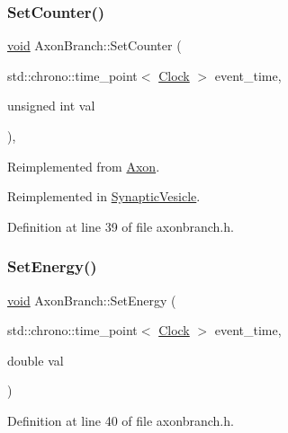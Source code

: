 \subsubsection{\texorpdfstring{Set\+Counter()}{SetCounter()}}
{\footnotesize\ttfamily \mbox{\hyperlink{glad_8h_a950fc91edb4504f62f1c577bf4727c29}{void}} Axon\+Branch\+::\+Set\+Counter (\begin{DoxyParamCaption}\item[{std\+::chrono\+::time\+\_\+point$<$ \mbox{\hyperlink{universe_8h_a0ef8d951d1ca5ab3cfaf7ab4c7a6fd80}{Clock}} $>$}]{event\+\_\+time,  }\item[{unsigned int}]{val }\end{DoxyParamCaption})\hspace{0.3cm}{\ttfamily [inline]}, {\ttfamily [virtual]}}



Reimplemented from \mbox{\hyperlink{class_axon_a3493cb97bde26bd66facc6084cd5f219}{Axon}}.



Reimplemented in \mbox{\hyperlink{class_synaptic_vesicle_a7fd7cfce5eccb904206d968866f85220}{Synaptic\+Vesicle}}.



Definition at line 39 of file axonbranch.\+h.

\mbox{\label{class_axon_branch_a6918dcaf6d9325a1a22a2e6c65ad5dab}} 
\subsubsection{\texorpdfstring{Set\+Energy()}{SetEnergy()}}
{\footnotesize\ttfamily \mbox{\hyperlink{glad_8h_a950fc91edb4504f62f1c577bf4727c29}{void}} Axon\+Branch\+::\+Set\+Energy (\begin{DoxyParamCaption}\item[{std\+::chrono\+::time\+\_\+point$<$ \mbox{\hyperlink{universe_8h_a0ef8d951d1ca5ab3cfaf7ab4c7a6fd80}{Clock}} $>$}]{event\+\_\+time,  }\item[{double}]{val }\end{DoxyParamCaption})\hspace{0.3cm}{\ttfamily [inline]}}



Definition at line 40 of file axonbranch.\+h.

\mbox{\label{class_axon_branch_a5a80bcccdc2be9f77fca25131937b52f}} 
